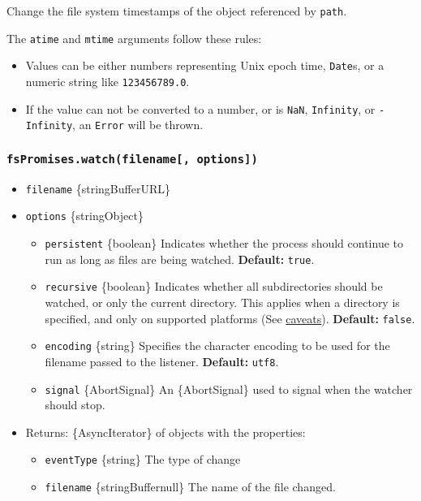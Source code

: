 Change the file system timestamps of the object referenced by
\texttt{path}.

The \texttt{atime} and \texttt{mtime} arguments follow these rules:

\begin{itemize}
\tightlist
\item
  Values can be either numbers representing Unix epoch time,
  \texttt{Date}s, or a numeric string like
  \texttt{\textquotesingle{}123456789.0\textquotesingle{}}.
\item
  If the value can not be converted to a number, or is \texttt{NaN},
  \texttt{Infinity}, or \texttt{-Infinity}, an \texttt{Error} will be
  thrown.
\end{itemize}

\subsubsection{\texorpdfstring{\texttt{fsPromises.watch(filename{[},\ options{]})}}{fsPromises.watch(filename{[}, options{]})}}\label{fspromises.watchfilename-options}

\begin{itemize}
\tightlist
\item
  \texttt{filename} \{string\textbar Buffer\textbar URL\}
\item
  \texttt{options} \{string\textbar Object\}

  \begin{itemize}
  \tightlist
  \item
    \texttt{persistent} \{boolean\} Indicates whether the process should
    continue to run as long as files are being watched.
    \textbf{Default:} \texttt{true}.
  \item
    \texttt{recursive} \{boolean\} Indicates whether all subdirectories
    should be watched, or only the current directory. This applies when
    a directory is specified, and only on supported platforms (See
    \hyperref[caveats]{caveats}). \textbf{Default:} \texttt{false}.
  \item
    \texttt{encoding} \{string\} Specifies the character encoding to be
    used for the filename passed to the listener. \textbf{Default:}
    \texttt{\textquotesingle{}utf8\textquotesingle{}}.
  \item
    \texttt{signal} \{AbortSignal\} An \{AbortSignal\} used to signal
    when the watcher should stop.
  \end{itemize}
\item
  Returns: \{AsyncIterator\} of objects with the properties:

  \begin{itemize}
  \tightlist
  \item
    \texttt{eventType} \{string\} The type of change
  \item
    \texttt{filename} \{string\textbar Buffer\textbar null\} The name of
    the file changed.
  \end{itemize}
\end{itemize}

